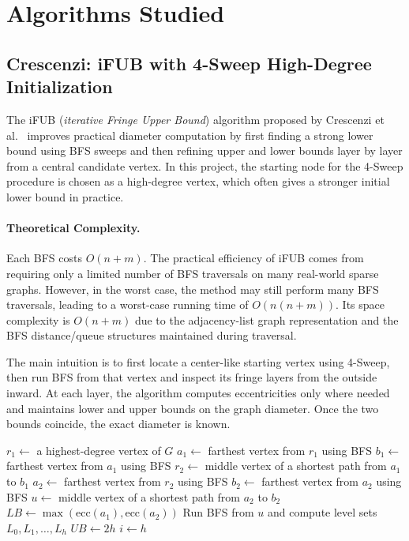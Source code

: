 \documentclass[11pt,a4paper]{article}
\begin{document}
\section{Algorithms Studied}

\subsection{Crescenzi: iFUB with 4-Sweep High-Degree Initialization}

The iFUB (\emph{iterative Fringe Upper Bound}) algorithm proposed by Crescenzi
et al.~\cite{crescenzi} improves practical
diameter computation by first finding a strong lower bound using BFS sweeps and
then refining upper and lower bounds layer by layer from a central candidate
vertex. In this project, the starting node for the 4-Sweep procedure is chosen
as a high-degree vertex, which often gives a stronger initial lower bound in
practice.

\paragraph{Theoretical Complexity.}
Each BFS costs $O(n+m)$. The practical efficiency of iFUB comes from requiring
only a limited number of BFS traversals on many real-world sparse graphs.
However, in the worst case, the method may still perform many BFS traversals,
leading to a worst-case running time of $O(n(n+m))$.
Its space complexity is $O(n+m)$ due to the adjacency-list graph representation
and the BFS distance/queue structures maintained during traversal.

The main intuition is to first locate a center-like starting vertex using
4-Sweep, then run BFS from that vertex and inspect its fringe layers from the
outside inward. At each layer, the algorithm computes eccentricities only where
needed and maintains lower and upper bounds on the graph diameter. Once the two
bounds coincide, the exact diameter is known.


\begin{algorithm}[H]
\caption{Crescenzi iFUB with 4-Sweep High-Degree Initialization}

$r_1 \leftarrow$ a highest-degree vertex of $G$\;
$a_1 \leftarrow$ farthest vertex from $r_1$ using BFS\;
$b_1 \leftarrow$ farthest vertex from $a_1$ using BFS\;
$r_2 \leftarrow$ middle vertex of a shortest path from $a_1$ to $b_1$\;
$a_2 \leftarrow$ farthest vertex from $r_2$ using BFS\;
$b_2 \leftarrow$ farthest vertex from $a_2$ using BFS\;
$u \leftarrow$ middle vertex of a shortest path from $a_2$ to $b_2$\;
$LB \leftarrow \max(\mathrm{ecc}(a_1), \mathrm{ecc}(a_2))$\;
Run BFS from $u$ and compute level sets $L_0, L_1, \dots, L_h$\;
$UB \leftarrow 2h$\;
$i \leftarrow h$\;
\;
\end{algorithm}
\end{document}
